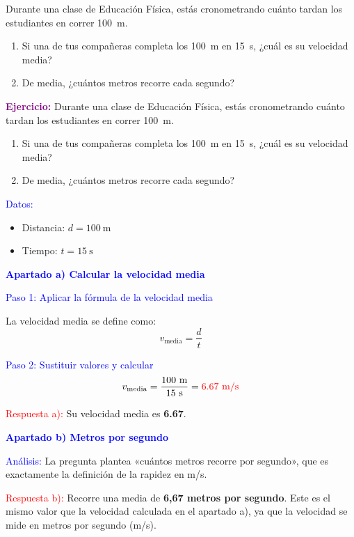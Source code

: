 \begin{exercise}
    Durante una clase de Educación Física, estás cronometrando cuánto tardan los estudiantes en correr \qty{100}{\m}.
    \begin{enumerate}[label=\letraminuscula]
        \item Si una de tus compañeras completa los \qty{100}{\m} en \qty{15}{\s}, ¿cuál es su velocidad media?
        \item De media, ¿cuántos metros recorre cada segundo?
    \end{enumerate}
    \begin{solu}
        \textbf{\textcolor{purple}{Ejercicio:}} Durante una clase de Educación Física, estás cronometrando cuánto tardan los estudiantes en correr \qty{100}{\m}.
        \begin{enumerate}[label=\letraminuscula]
            \item Si una de tus compañeras completa los \qty{100}{\m} en \qty{15}{\s}, ¿cuál es su velocidad media?
            \item De media, ¿cuántos metros recorre cada segundo?
        \end{enumerate}

        \vspace{0.3cm}

        \textcolor{blue}{Datos:}
        \begin{itemize}
            \item Distancia: $d = \qty{100}{\m}$
            \item Tiempo: $t = \qty{15}{\s}$
        \end{itemize}

        \textbf{\textcolor{blue}{Apartado a) Calcular la velocidad media}}

        \textcolor{blue}{Paso 1: Aplicar la fórmula de la velocidad media}

        La velocidad media se define como:
        \[
            \boxed{v_{\text{media}} = \frac{d}{t}}
        \]

        \textcolor{blue}{Paso 2: Sustituir valores y calcular}
        \[
            v_{\text{media}} = \frac{100 \text{ m}}{15 \text{ s}} = \textcolor{red}{6.67 \text{ m/s}}
        \]

        \textcolor{red}{Respuesta a):} Su velocidad media es \textbf{\qty{6.67}{\mps}}.

        \vspace{0.5cm}

        \textbf{\textcolor{blue}{Apartado b) Metros por segundo}}

        \textcolor{blue}{Análisis:} La pregunta plantea «cuántos metros recorre por segundo», que es exactamente la definición de la rapidez en m/s.

        \textcolor{red}{Respuesta b):} Recorre una media de \textbf{6,67 metros por segundo}. Este es el mismo valor que la velocidad calculada en el apartado a), ya que la velocidad se mide en metros por segundo (m/s).
    \end{solu}
\end{exercise}



